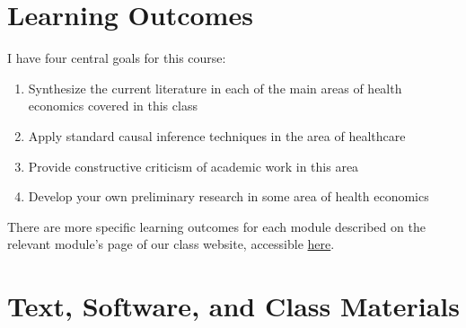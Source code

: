 \documentclass[11pt,]{article}
\begin{document}
\hypertarget{learning-outcomes}{%
\section{Learning Outcomes}\label{learning-outcomes}}

I have four central goals for this course:

\begin{enumerate}
\def\labelenumi{\arabic{enumi}.}
\item
  Synthesize the current literature in each of the main areas of health
  economics covered in this class
\item
  Apply standard causal inference techniques in the area of healthcare
\item
  Provide constructive criticism of academic work in this area
\item
  Develop your own preliminary research in some area of health economics
\end{enumerate}

There are more specific learning outcomes for each module described on
the relevant module's page of our class website, accessible
\href{https://imccart.github.io/Econ-771/}{here}.

\hypertarget{text-software-and-class-materials}{%
\section{Text, Software, and Class
Materials}\label{text-software-and-class-materials}}
\end{document}
